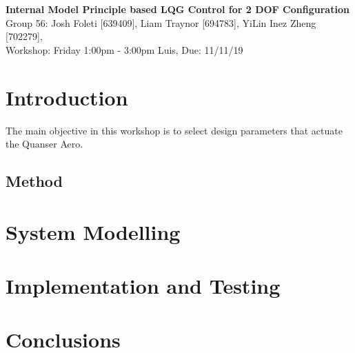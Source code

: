 \documentclass[11pt]{article}
\begin{document}

\clearpage
\setcounter{page}{1}

\begin{center}
\textbf{\Large{Internal Model Principle based LQG Control for 2 DOF Configuration}}\\
Group 56: Josh Foleti [639409], Liam Traynor [694783], YiLin Inez Zheng [702279], \\
Workshop: Friday 1:00pm - 3:00pm Luis, Due: 11/11/19  
\end{center}

\section{Introduction}
The main objective in this workshop is to select design parameters that actuate the Quanser Aero.

\subsection{Method}

\section{System Modelling}

\section{Implementation and Testing}

\section{Conclusions}
\end{document}
